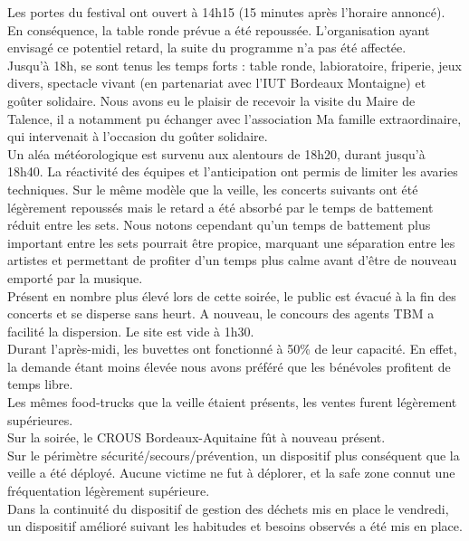 \documentclass[12pt,a4paper]{report}
\begin{document}
Les portes du festival ont ouvert à 14h15 (15 minutes après l'horaire annoncé). En conséquence, la table ronde prévue a été repoussée. L'organisation ayant envisagé ce potentiel retard, la suite du programme n'a pas été affectée.\\

Jusqu'à 18h, se sont tenus les temps forts : table ronde, labioratoire, friperie, jeux divers, spectacle vivant (en partenariat avec l'IUT Bordeaux Montaigne) et goûter solidaire. Nous avons eu le plaisir de recevoir la visite du Maire de Talence, il a notamment pu échanger avec l'association Ma famille extraordinaire, qui intervenait à l'occasion du goûter solidaire.\\

Un aléa météorologique est survenu aux alentours de 18h20, durant jusqu'à 18h40. La réactivité des équipes et l'anticipation ont permis de limiter les avaries techniques. Sur le même modèle que la veille, les concerts suivants ont été légèrement repoussés mais le retard a été absorbé par le temps de battement réduit entre les sets. Nous notons cependant qu'un temps de battement plus important entre les sets pourrait être propice, marquant une séparation entre les artistes et permettant de profiter d'un temps plus calme avant d'être de nouveau emporté par la musique.\\

Présent en nombre plus élevé lors de cette soirée, le public est évacué à la fin des concerts et se disperse sans heurt. A nouveau, le concours des agents TBM a facilité la dispersion. Le site est vide à 1h30.\\

Durant l'après-midi, les buvettes ont fonctionné à 50\% de leur capacité. En effet, la demande étant moins élevée nous avons préféré que les bénévoles profitent de temps libre.\\


Les mêmes food-trucks que la veille étaient présents, les ventes furent légèrement supérieures.\\

Sur la soirée, le CROUS Bordeaux-Aquitaine fût à nouveau présent.\\

Sur le périmètre sécurité/secours/prévention, un dispositif plus conséquent que la veille a été déployé. Aucune victime ne fut à déplorer, et la safe zone connut une fréquentation légèrement supérieure.\\

Dans la continuité du dispositif de gestion des déchets mis en place le vendredi, un dispositif amélioré suivant les habitudes et besoins observés a été mis en place.\\
\end{document}
